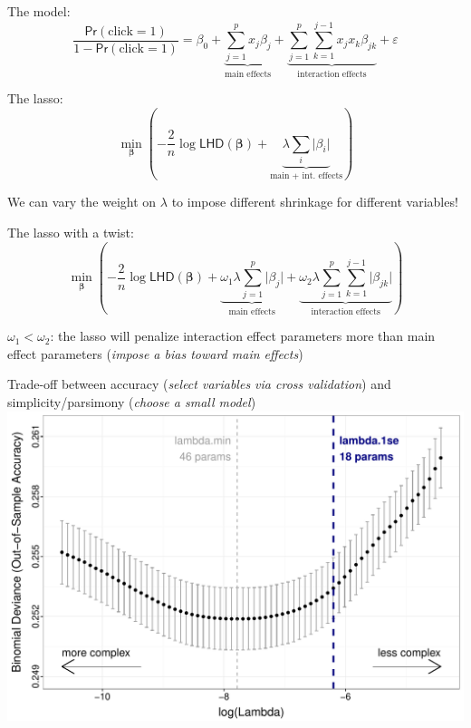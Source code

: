 \documentclass[11pt,xcolor=svgnames]{beamer}
\newcommand{\fg}{\color{ForestGreen}}
\newcommand{\nv}{\color{Navy}}
\newcommand{\bm}[1]{\mathbf{#1}}
\begin{document}
\begin{frame}

The model:
\[ \frac{\textsf{Pr}(\text{click}=1)}{1-\textsf{Pr}(\text{click}=1)} = \beta_0 + \underbrace{\sum_{j=1}^{p} x_j \beta_j}_{\text{main effects}} + \underbrace{\sum_{j=1}^p \sum_{k=1}^{j-1} x_j x_k \beta_{jk}}_{\text{interaction effects}} + \varepsilon \]

The lasso:
\[ \min_{\bm{\beta}} \left(-\frac{2}{n}\log{\textsf{LHD}(\bm{\beta})} + \underbrace{\lambda \sum_{i} \vert \beta_i \vert}_{\text{main + int. effects}} \right) \]

\vskip 0.25cm \nv 
We can vary the weight on $\lambda$ to impose different shrinkage for different variables!

\end{frame}

\begin{frame}

The lasso with a twist:
\[ \min_{\bm{\beta}} \left(-\frac{2}{n}\log{\textsf{LHD}(\bm{\beta})} + \underbrace{\omega_1 \lambda \sum_{j=1}^{p} \vert \beta_j \vert}_{\text{main effects}} + \underbrace{\omega_2 \lambda \sum_{j=1}^p \sum_{k=1}^{j-1} \vert \beta_{jk} \vert}_{\text{interaction effects}} \right) \]

\vskip 0.5cm 
$\omega_1 < \omega_2$: the lasso will penalize interaction effect parameters more than main effect parameters (\textit{\fg impose a bias toward main effects})

\end{frame}


\begin{frame}
Trade-off between accuracy (\textit{\fg select variables via cross validation}) and simplicity/parsimony (\textit{\fg choose a small model})
\includegraphics[width=\textwidth]{regpath2.pdf}
\end{frame}
\end{document}
